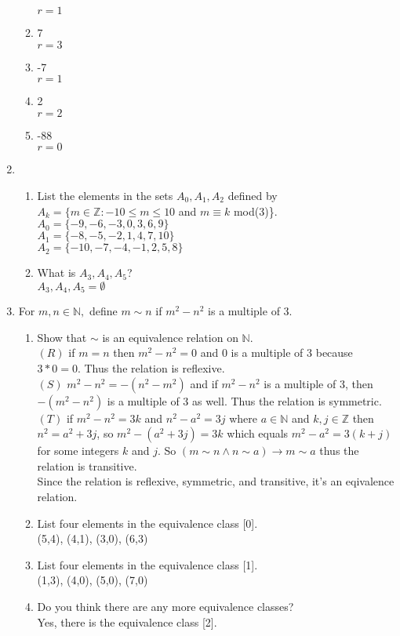 \documentclass[11pt]{article}
\newcommand{\N}{\mathbb{N}}
\newcommand{\Z}{\mathbb{Z}}
\begin{document}
\begin{enumerate}
\begin{enumerate}
	$r=1$
	\item 7\\
	$r=3$
	\item -7\\
	$r=1$
	\item 2\\
	$r=2$
	\item -88\\
	$r=0$
	\end{enumerate}
\setcounter{enumi}{7}
\item
	\begin{enumerate}
	\item List the elements in the sets $A_0,A_1,A_2$ defined by\\
		$A_k=\{m\in\Z:-10\leq m\leq 10$ and $m\equiv k$ mod(3)\}.\\
	$A_0=\{-9,-6,-3,0,3,6,9\}$\\
	$A_1=\{-8,-5,-2,1,4,7,10\}$\\
	$A_2=\{-10,-7,-4,-1,2,5,8\}$
	\item What is $A_3,A_4,A_5$?\\
	$A_3,A_4,A_5=\emptyset$
	\end{enumerate}
\setcounter{enumi}{11}
\item For $m,n\in\N,$ define $m\sim n$ if $m^2-n^2$ is a multiple of 3.
	\begin{enumerate}
	\item Show that $\sim$ is an equivalence relation on $\N$.\\
	$(R)$ if $m=n$ then $m^2-n^2=0$ and 0 is a multiple of 3 because $3*0=0$. Thus the relation is reflexive.\\
	$(S)$ $m^2-n^2=-(n^2-m^2)$ and if $m^2-n^2$ is a multiple of 3, then $-(m^2-n^2)$ is a multiple of 3 as well. Thus the 			relation is symmetric. \\
	$(T)$ if $m^2-n^2=3k$ and $n^2-a^2=3j$ where $a\in\N$ and $k,j\in\Z$ then $n^2=a^2+3j$, so $m^2-(a^2+3j)=3k$ which equals
	$m^2-a^2=3(k+j)$ for some integers $k$ and $j$. So $(m\sim n\wedge n\sim a)\to m\sim a$ thus the relation is transitive.\\
	Since the relation is reflexive, symmetric, and transitive, it's an eqivalence relation.
	\item List four elements in the equivalence class [0].\\
	(5,4), (4,1), (3,0), (6,3)
	\item List four elements in the equivalence class [1].\\
	(1,3), (4,0), (5,0), (7,0)
	\item Do you think there are any more equivalence classes?\\
	Yes, there is the equivalence class [2].
	\end{enumerate}
\end{enumerate}
\end{document}
